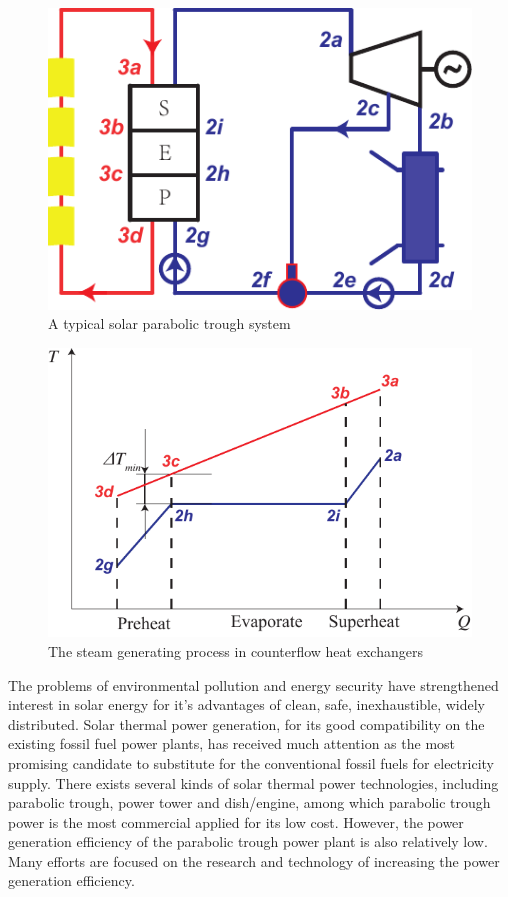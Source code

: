 \documentclass{article}
\begin{document}
\begin{figure}[htbp]
\centering
	\includegraphics[width = 0.4\columnwidth]{fig/PTC}
	\caption{A typical solar parabolic trough system}
	\label{fig:PTC}
\end{figure}
\begin{figure}[htbp]
\centering
	\includegraphics[width = 0.5\columnwidth]{fig/DeltaTmin}
	\caption{The steam generating process in counterflow heat exchangers}
	\label{fig:DeltaTmin}
\end{figure}


The problems of environmental pollution and energy security have strengthened interest in solar energy for it's advantages of clean, safe, inexhaustible, widely distributed. Solar thermal power generation, for its good compatibility on the existing fossil fuel power plants, has received much attention as the most promising candidate to substitute for the conventional fossil fuels for electricity supply. There exists several kinds of solar thermal power technologies, including parabolic trough, power tower and dish/engine, among which parabolic trough power is the most commercial applied for its low cost. However, the power generation efficiency of the parabolic trough power plant is also relatively low. Many efforts are focused on the research and technology of increasing the power generation efficiency.
\end{document}
